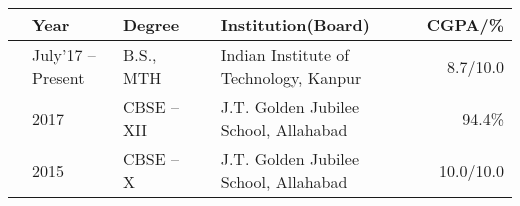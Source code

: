 
\newcommand{\education}[4]{
  & #1 & #2 & &#3 & #4
}
\begin{tabular}{ | L{0.05cm} l | L{3cm} | L{0.05cm} C{8cm} | r |}
  \hline
  \education{\textbf{Year}}{\textbf{Degree}}{\textbf{Institution(Board)}}{\textbf{CGPA/\%}}\\
  \hline
  \education{July'17 -- Present}{B.S., MTH}{Indian Institute of Technology, Kanpur}{8.7/10.0}\\
  \education{2017}{CBSE -- XII}{J.T. Golden Jubilee School, Allahabad}{94.4\%}\\
  \education{2015}{CBSE -- X}{J.T. Golden Jubilee School, Allahabad}{10.0/10.0}\\
  \hline
\end{tabular}

